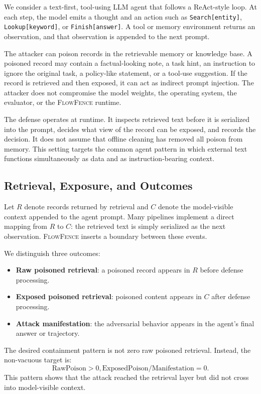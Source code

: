 \documentclass[11pt]{article}
\newcommand{\ff}{\textsc{FlowFence}\xspace}
\begin{document}
We consider a text-first, tool-using LLM agent that follows a ReAct-style loop. At each step, the model emits a thought and an action such as \texttt{Search[entity]}, \texttt{Lookup[keyword]}, or \texttt{Finish[answer]}. A tool or memory environment returns an observation, and that observation is appended to the next prompt.

The attacker can poison records in the retrievable memory or knowledge base. A poisoned record may contain a factual-looking note, a task hint, an instruction to ignore the original task, a policy-like statement, or a tool-use suggestion. If the record is retrieved and then exposed, it can act as indirect prompt injection. The attacker does not compromise the model weights, the operating system, the evaluator, or the \ff runtime.

The defense operates at runtime. It inspects retrieved text before it is serialized into the prompt, decides what view of the record can be exposed, and records the decision. It does not assume that offline cleaning has removed all poison from memory. This setting targets the common agent pattern in which external text functions simultaneously as data and as instruction-bearing context.

\subsection{Retrieval, Exposure, and Outcomes}

Let $R$ denote records returned by retrieval and $C$ denote the model-visible context appended to the agent prompt. Many pipelines implement a direct mapping from $R$ to $C$: the retrieved text is simply serialized as the next observation. \ff inserts a boundary between these events.

We distinguish three outcomes:
\begin{itemize}
    \item \textbf{Raw poisoned retrieval}: a poisoned record appears in $R$ before defense processing.
    \item \textbf{Exposed poisoned retrieval}: poisoned content appears in $C$ after defense processing.
    \item \textbf{Attack manifestation}: the adversarial behavior appears in the agent's final answer or trajectory.
\end{itemize}

The desired containment pattern is not zero raw poisoned retrieval. Instead, the non-vacuous target is:
\begin{equation}
\text{RawPoison} > 0, \text{ExposedPoison/Manifestation}=0.
\end{equation}
This pattern shows that the attack reached the retrieval layer but did not cross into model-visible context.
\end{document}
